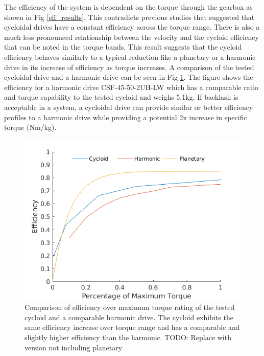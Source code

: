 The efficiency of the system is dependent on the torque through the gearbox as shown in Fig \ref{eff_results}.
This contradicts previous studies that suggested that cycloidal drives have a constant efficiency across the torque range.
There is also a much less pronounced relationship between the velocity and the cycloid efficiency that can be noted in the torque bands.
This result suggests that the cycloid efficiency behaves similarly to a typical reduction like a planetary or a harmonic drive in its increase of efficiency as torque increases. 
A comparison of the tested cycloidal drive and a harmonic drive can be seen in Fig \ref{eff_comp}.
The figure shows the efficiency for a harmonic drive CSF-45-50-2UH-LW \cite{harmonic_sheet} which has a comparable ratio and torque capability to the tested cycloid and weighs 5.1kg.
If backlash is acceptable in a system, a cycloidal drive can provide similar or better efficiency profiles to a harmonic drive while providing a potential 2x increase in specific torque (Nm/kg).

\begin{figure}[t]
   \centering
   \includegraphics[width=\linewidth]{images/eff_comp_v3}
   \caption{Comparison of efficiency over maximum torque rating of the tested cycloid and a comparable harmonic drive.
   The cycloid exhibits the same efficiency increase over torque range and has a comparable and slightly higher efficiency than the harmonic. TODO: Replace with version not including planetary}
   \label{eff_comp}
\end{figure}

